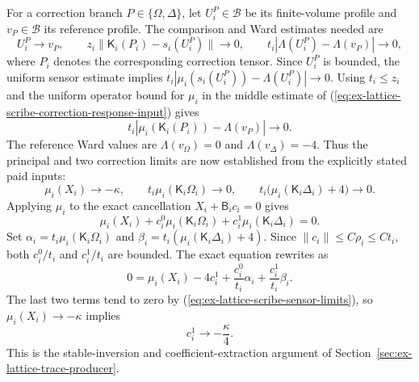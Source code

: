For a correction branch $P\in\{\Omega,\Delta\}$, let $U_i^P\in\mathcal B$
be its finite-volume profile and $v_P\in\mathcal B$ its reference profile.
The comparison and
Ward estimates needed are
\begin{equation}
 U_i^P\to v_P,\qquad
 z_i\|\mathsf K_i(P_i)-s_i(U_i^P)\|\to0,\qquad
 t_i|\Lambda(U_i^P)-\Lambda(v_P)|\to0,
 \label{eq:ex-lattice-scribe-correction-response-input}
\end{equation}
where $P_i$ denotes the corresponding correction tensor. Since $U_i^P$ is
bounded, the uniform sensor estimate implies
$t_i|\mu_i(s_i(U_i^P))-\Lambda(U_i^P)|\to0$. Using $t_i\le z_i$ and the
uniform operator bound for $\mu_i$ in the middle estimate of
(\ref{eq:ex-lattice-scribe-correction-response-input}) gives
\[
 t_i\left|\mu_i(\mathsf K_i(P_i))-\Lambda(v_P)\right|\longrightarrow0.
\]
The reference Ward values are $\Lambda(v_\Omega)=0$ and
$\Lambda(v_\Delta)=-4$. Thus the principal and two correction limits are
now established from the explicitly stated paid inputs:
\begin{equation}
 \mu_i(X_i)\to-\kappa,\qquad
 t_i\mu_i(\mathsf K_i\Omega_i)\to0,\qquad
 t_i\bigl(\mu_i(\mathsf K_i\Delta_i)+4\bigr)\to0.
 \label{eq:ex-lattice-scribe-sensor-limits}
\end{equation}
Applying $\mu_i$ to the exact cancellation $X_i+\mathsf B_i c_i=0$ gives
\[
 \mu_i(X_i)+c_i^0\mu_i(\mathsf K_i\Omega_i)
       +c_i^1\mu_i(\mathsf K_i\Delta_i)=0.
\]
Set $\alpha_i=t_i\mu_i(\mathsf K_i\Omega_i)$ and
$\beta_i=t_i(\mu_i(\mathsf K_i\Delta_i)+4)$. Since
$\|c_i\|\le C\rho_i\le Ct_i$, both $c_i^0/t_i$ and $c_i^1/t_i$ are
bounded. The exact equation rewrites as
\[
 0=\mu_i(X_i)-4c_i^1+
       \frac{c_i^0}{t_i}\alpha_i+\frac{c_i^1}{t_i}\beta_i.
\]
The last two terms tend to zero by
(\ref{eq:ex-lattice-scribe-sensor-limits}), so
$\mu_i(X_i)\to-\kappa$ implies
\[
 c_i^1\longrightarrow-\frac{\kappa}{4}.
\]
This is the stable-inversion and coefficient-extraction argument of
Section~\ref{sec:ex-lattice-trace-producer}.

